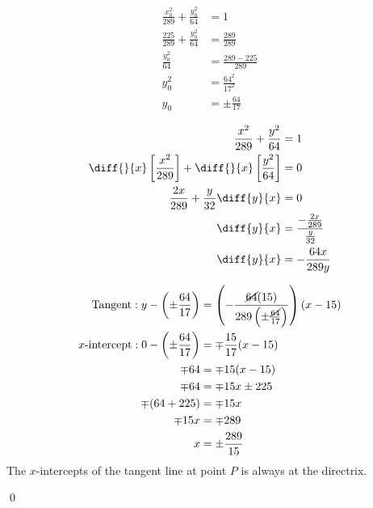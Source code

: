 \documentclass{article}
\begin{document}
\begin{itemize}
	\centering
	\begin{minipage}[t]{0.4\linewidth}
		\begin{align*}
			\frac{x_0^2}{289}+\frac{y_0^2}{64}&=1 \\
			\frac{225}{289}+\frac{y_0^2}{64}&=\frac{289}{289} \\
			\frac{y_0^2}{64}&=\frac{289-225}{289} \\
			y_0^2&=\frac{64^2}{17^2} \\
			y_0&=\pm\frac{64}{17}
		\end{align*}
	\end{minipage}
	\vline
	\begin{minipage}[t]{0.4\linewidth}
		\begin{align*}
			\frac{x^2}{289}+\frac{y^2}{64}&=1 \\
			\diff{}{x}\left[\frac{x^2}{289}\right]+\diff{}{x}\left[\frac{y^2}{64}\right]&=0 \\
			\frac{2x}{289}+\frac{y}{32}\diff{y}{x}&=0 \\
			\diff{y}{x}&=\frac{-\frac{2x}{289}}{\frac{y}{32}} \\
			\diff{y}{x}&=-\frac{64x}{289y}
		\end{align*}
	\end{minipage}
	\flushleft

	\begin{align*}
		\text{Tangent}:y-\left(\pm\frac{64}{17}\right)&=\left(-\frac{\cancel{64}(15)}{289\left(\pm\frac{\cancel{64}}{17}\right)}\right)\left(x-15\right) \\
		\text{$x$-intercept}:0-\left(\pm\frac{64}{17}\right)&=\mp\frac{15}{17}(x-15) \\
		\mp64&=\mp15(x-15) \\
		\mp64&=\mp15x\pm225 \\
		\mp(64+225)&=\mp15x \\
		\mp15x&=\mp289 \\
		x&=\pm\frac{289}{15}
	\end{align*}
	The $x$-intercepts of the tangent line at point $P$ is always at the directrix.
	
	\qed

\end{itemize}
\end{document}
